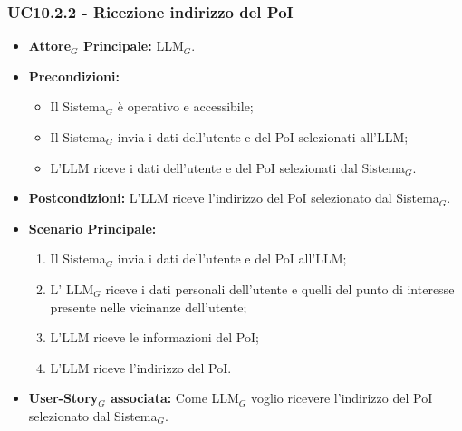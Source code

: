 \documentclass[10pt]{article}
\begin{document}
\begin{justify}
\subsubsection{\textbf{UC10.2.2 - Ricezione indirizzo del PoI}}
\begin{itemize}
    \item \textbf{Attore$_G$ Principale:} LLM$_G$.
    \item \textbf{Precondizioni:} 
        \begin{itemize}
          \item Il Sistema$_G$ è operativo e accessibile;
          \item Il Sistema$_G$ invia i dati dell'utente e del PoI selezionati all'LLM;
            \item L'LLM riceve i dati dell'utente e del PoI selezionati dal Sistema$_G$.
        \end{itemize}
      \item \textbf{Postcondizioni:} L'LLM riceve l'indirizzo del PoI selezionato dal Sistema$_G$.
    \item \textbf{Scenario Principale:} 
        \begin{enumerate}
          \item Il Sistema$_G$ invia i dati dell'utente e del PoI all'LLM;
        \item L' LLM$_G$ riceve i dati personali dell'utente e quelli del punto di interesse presente nelle vicinanze dell'utente;
          \item L'LLM riceve le informazioni del PoI;
          \item L'LLM riceve l'indirizzo del PoI.
        \end{enumerate}
      \item \textbf{User-Story$_G$ associata:} Come LLM$_G$ voglio ricevere l'indirizzo del PoI selezionato dal Sistema$_G$.
\end{itemize}

\end{justify}
\end{document}
